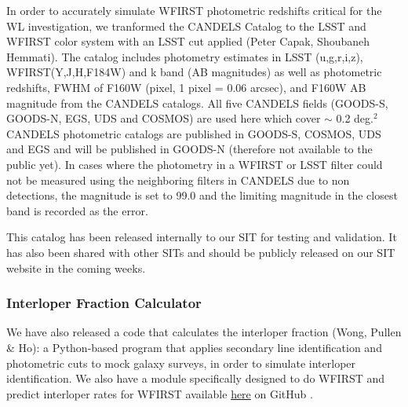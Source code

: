 In order to accurately simulate WFIRST photometric redshifts critical for the WL investigation, we tranformed the CANDELS Catalog to the LSST and WFIRST color system with an LSST cut applied (Peter Capak, Shoubaneh Hemmati). The catalog includes photometry estimates in LSST (u,g,r,i,z), WFIRST(Y,J,H,F184W) and k band (AB magnitudes) as well as photometric redshifts, FWHM of F160W (pixel, 1 pixel = 0.06 arcsec), and F160W AB magnitude from the CANDELS catalogs. All five CANDELS fields (GOODS-S, GOODS-N, EGS, UDS and COSMOS) are used here which cover $\sim$ 0.2 deg.$^2$ CANDELS photometric catalogs are published in GOODS-S, COSMOS, UDS and EGS and will be published in GOODS-N (therefore not available to the public yet). In cases where the photometry in a WFIRST or LSST filter could not be measured using the neighboring filters in CANDELS due to non detections, the magnitude is set to 99.0 and the limiting magnitude in the closest band is recorded as the error.

This catalog has been released internally to our SIT for testing and validation. It has also been shared with other SITs and should be publicly released on our SIT website in the coming weeks.

\subsubsection{Interloper Fraction Calculator}

 We have also released a code that calculates the interloper fraction (Wong, Pullen \& Ho): a Python-based program that applies secondary line identification and photometric cuts to mock galaxy surveys, in order to simulate interloper identification.  We also have a module specifically designed to do WFIRST and predict interloper rates for WFIRST available  \href{https://github.com/kazewong/Intercut}{here} on GitHub \citep{Wong:2016eku}.
